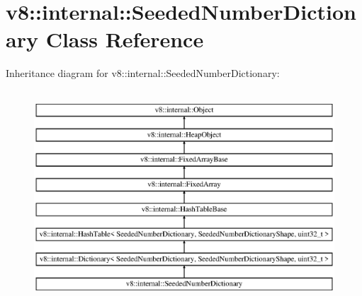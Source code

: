 \hypertarget{classv8_1_1internal_1_1_seeded_number_dictionary}{}\section{v8\+:\+:internal\+:\+:Seeded\+Number\+Dictionary Class Reference}
\label{classv8_1_1internal_1_1_seeded_number_dictionary}
Inheritance diagram for v8\+:\+:internal\+:\+:Seeded\+Number\+Dictionary\+:\begin{figure}[H]
\begin{center}
\leavevmode
\includegraphics[height=8.000000cm]{classv8_1_1internal_1_1_seeded_number_dictionary}
\end{center}
\end{figure}
